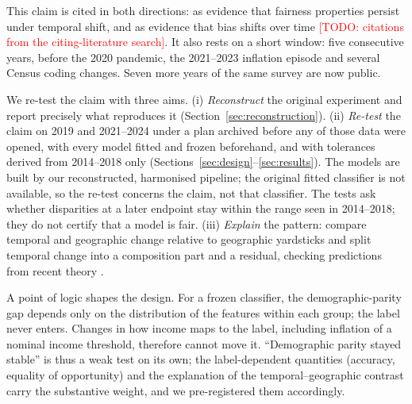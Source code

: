 \documentclass[10pt]{article}
\newcommand{\todo}[1]{\textcolor{red}{[TODO: #1]}}
\begin{document}
This claim is cited in both directions: as evidence that fairness properties persist under temporal shift, and as evidence that bias shifts over time \todo{citations from the citing-literature search}.
It also rests on a short window: five consecutive years, before the 2020 pandemic, the 2021--2023 inflation episode and several Census coding changes.
Seven more years of the same survey are now public.

We re-test the claim with three aims.
(i) \emph{Reconstruct} the original experiment and report precisely what reproduces it (Section~\ref{sec:reconstruction}).
(ii) \emph{Re-test} the claim on 2019 and 2021--2024 under a plan archived before any of those data were opened, with every model fitted and frozen beforehand, and with tolerances derived from 2014--2018 only (Sections~\ref{sec:design}--\ref{sec:results}). The models are built by our reconstructed, harmonised pipeline; the original fitted classifier is not available, so the re-test concerns the claim, not that classifier. The tests ask whether disparities at a later endpoint stay within the range seen in 2014--2018; they do not certify that a model is fair.
(iii) \emph{Explain} the pattern: compare temporal and geographic change relative to geographic yardsticks and split temporal change into a composition part and a residual, checking predictions from recent theory \citep{chen2022fairness,asiaee2026fairness}.

A point of logic shapes the design.
For a frozen classifier, the demographic-parity gap depends only on the distribution of the features within each group; the label never enters.
Changes in how income maps to the label, including inflation of a nominal income threshold, therefore cannot move it.
``Demographic parity stayed stable'' is thus a weak test on its own; the label-dependent quantities (accuracy, equality of opportunity) and the explanation of the temporal--geographic contrast carry the substantive weight, and we pre-registered them accordingly.
\end{document}
